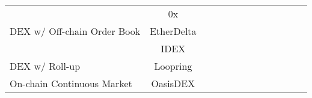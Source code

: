 \begin{table*}[t]
\begin{tabular}{|l|c|p{0.4cm}|p{0.4cm}|p{0.4cm}|p{0.4cm}|p{0.4cm}|p{0.4cm}|p{0.4cm}|p{0.4cm}|p{0.4cm}|p{0.4cm}|p{0.4cm}|}
\multirow{3}{*}{DEX w/ Off-chain Order Book}	&0x				&\multirow{3}{*}{\full}		&\multirow{3}{*}{\full}		&\multirow{3}{*}{\full}		&\multirow{3}{*}{}		&\multirow{3}{*}{}		&\multirow{3}{*}{\prt} 		&\multirow{3}{*}{\full}		&\multirow{3}{*}{ }		&\multirow{3}{*}{\full }		&\multirow{3}{*}{\full}		&\multirow{3}{*}{\full} 		\\ 
							       	&EtherDelta		& 						&						&						&						&						&						&						&						&						& 						&						\\
								&IDEX     			& 						&						&						&						&						&						&						&						&						& 						&						\\ \hline
\multirow{1}{*}{DEX w/ Roll-up}    			&Loopring			&\multirow{1}{*}{\full}		&\multirow{1}{*}{\full}		&\multirow{1}{*}{}		&\multirow{1}{*}{}		&\multirow{1}{*}{}		&\multirow{1}{*}{\prt} 		&\multirow{1}{*}{\prt}		&\multirow{1}{*}{}		&\multirow{1}{*}{\full}		&\multirow{1}{*}{\full }		&\multirow{1}{*}{\full } 		\\ \hline

\multirow{1}{*}{On-chain Continuous Market}	&OasisDEX			&\multirow{1}{*}{\full}		&\multirow{1}{*}{\full}		&\multirow{1}{*}{\full}		&\multirow{1}{*}{}		&\multirow{1}{*}{\full}		&\multirow{1}{*}{} 		&\multirow{1}{*}{}		&\multirow{1}{*}{}		&\multirow{1}{*}{\full}		&\multirow{1}{*}{\full }		&\multirow{1}{*}{\full } 		\\ \hline


\end{tabular}
\end{table*}
